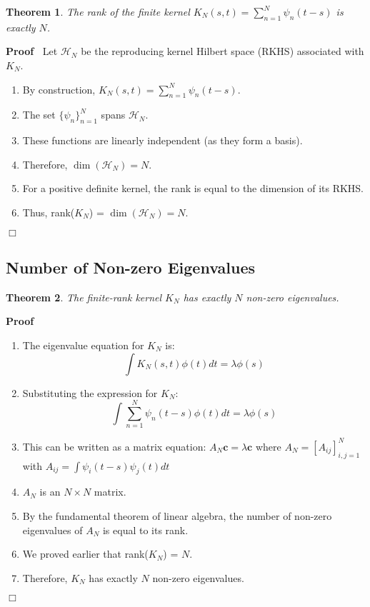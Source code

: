 \documentclass{article}
\newenvironment{proof}{\noindent\textbf{Proof\ }}{\hspace*{\fill}$\Box$\medskip}
\newtheorem{theorem}{Theorem}
\begin{document}
\begin{theorem}
  The rank of the finite kernel $K_N (s, t) = \sum_{n = 1}^N \psi_n  (t - s)$
  is exactly $N$.
\end{theorem}

\begin{proof}
  Let $\mathcal{H}_N$ be the reproducing kernel Hilbert space (RKHS)
  associated with $K_N$.
  \begin{enumerate}
    \item By construction, $K_N (s, t) = \sum_{n = 1}^N \psi_n  (t - s)$.
    
    \item The set $\{\psi_n \}_{n = 1}^N$ spans $\mathcal{H}_N$.
    
    \item These functions are linearly independent (as they form a basis).
    
    \item Therefore, $\dim (\mathcal{H}_N) = N$.
    
    \item For a positive definite kernel, the rank is equal to the dimension
    of its RKHS.
    
    \item Thus, rank($K_N$) = $\dim (\mathcal{H}_N) = N$.
  \end{enumerate}
\end{proof}

\subsection{Number of Non-zero Eigenvalues}

\begin{theorem}
  The finite-rank kernel $K_N$ has exactly $N$ non-zero eigenvalues.
\end{theorem}

\begin{proof}
  \begin{enumerate}
    \item The eigenvalue equation for $K_N$ is:
    \[ \int K_N (s, t) \phi (t) dt = \lambda \phi (s) \]
    \item Substituting the expression for $K_N$:
    \[ \int \sum_{n = 1}^N \psi_n  (t - s) \phi (t) dt = \lambda \phi (s) \]
    \item This can be written as a matrix equation: $A_N \mathbf{c} = \lambda
    \mathbf{c}$ where $A_N = [A_{ij}]_{i, j = 1}^N$ with $A_{ij} = \int \psi_i
    (t - s) \psi_j (t) dt$
    
    \item $A_N$ is an $N \times N$ matrix.
    
    \item By the fundamental theorem of linear algebra, the number of non-zero
    eigenvalues of $A_N$ is equal to its rank.
    
    \item We proved earlier that rank($K_N$) = $N$.
    
    \item Therefore, $K_N$ has exactly $N$ non-zero eigenvalues.
  \end{enumerate}
\end{proof}
\end{document}
